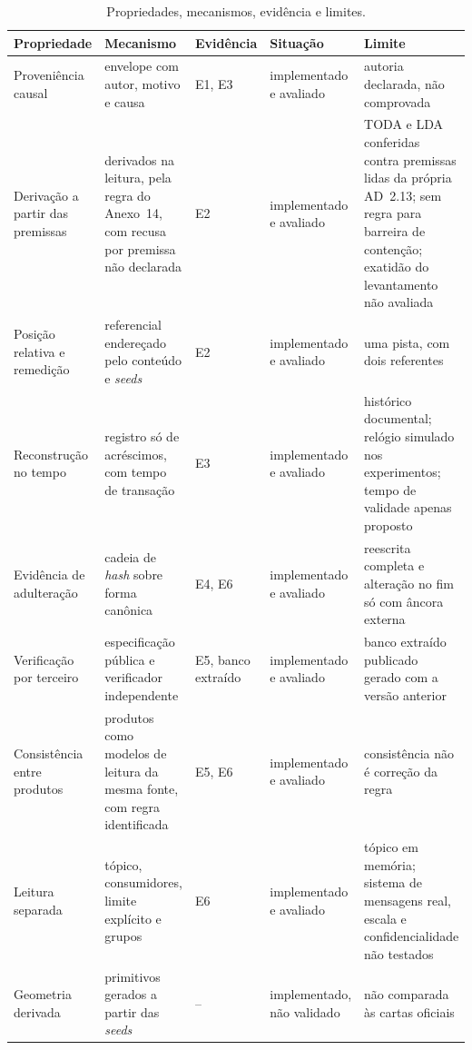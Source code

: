 \begin{table}[htbp]
    \centering
    \caption{Propriedades, mecanismos, evidência e limites.}
    \label{tab:disc-demonstrado}
    \footnotesize
    \renewcommand{\arraystretch}{1.2}
    \begin{tabularx}{\linewidth}{>{\raggedright\arraybackslash}p{2.75cm} >{\raggedright\arraybackslash}X l >{\raggedright\arraybackslash}p{2.2cm} >{\raggedright\arraybackslash}X}
        \toprule
        Propriedade & Mecanismo & Evidência & Situação & Limite \\
        \midrule
        Proveniência causal & envelope com autor, motivo e causa & E1, E3 & implementado e avaliado & autoria declarada, não comprovada \\
        Derivação a partir das premissas & derivados na leitura, pela regra do Anexo~14, com recusa por premissa não declarada & E2 & implementado e avaliado & TODA e LDA conferidas contra premissas lidas da própria AD~2.13; sem regra para barreira de contenção; exatidão do levantamento não avaliada \\
        Posição relativa e remedição & referencial endereçado pelo conteúdo e \textit{seeds} & E2 & implementado e avaliado & uma pista, com dois referentes \\
        Reconstrução no tempo & registro só de acréscimos, com tempo de transação & E3 & implementado e avaliado & histórico documental; relógio simulado nos experimentos; tempo de validade apenas proposto \\
        Evidência de adulteração & cadeia de \textit{hash} sobre forma canônica & E4, E6 & implementado e avaliado & reescrita completa e alteração no fim só com âncora externa \\
        Verificação por terceiro & especificação pública e verificador independente & E5, banco extraído & implementado e avaliado & banco extraído publicado gerado com a versão anterior \\
        Consistência entre produtos & produtos como modelos de leitura da mesma fonte, com regra identificada & E5, E6 & implementado e avaliado & consistência não é correção da regra \\
        Leitura separada & tópico, consumidores, limite explícito e grupos & E6 & implementado e avaliado & tópico em memória; sistema de mensagens real, escala e confidencialidade não testados \\
        Geometria derivada & primitivos gerados a partir das \textit{seeds} & -- & implementado, não validado & não comparada às cartas oficiais \\

\end{tabularx}
\end{table}
